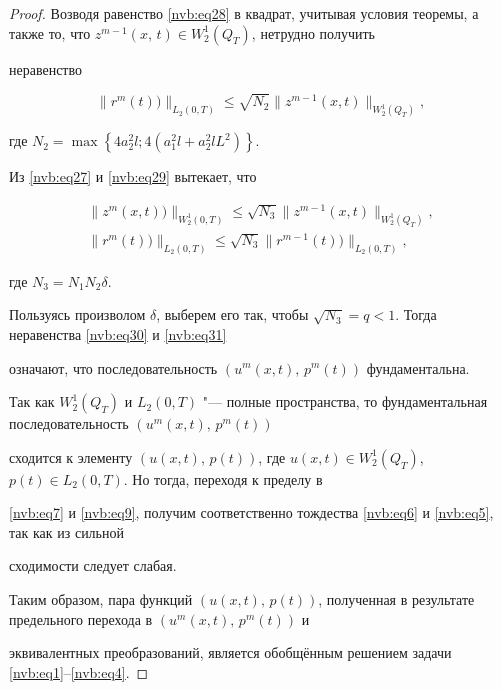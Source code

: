 \begin{proof}
Возводя равенство \eqref{nvb:eq28} в квадрат, учитывая условия теоремы, а также то, что $z^{m-1}(x,\,t)\in W_2^{1}(Q_T)$, нетрудно получить

неравенство

    \begin{equation} \label{nvb:eq29}

     \|r^m(t))\|_{L_2(0,T)} \leq  \sqrt{N_2} \|z^{m-1}(x,t)\|_{W^1_2(Q_T)},

    \end{equation}

где $N_2=\max\left\lbrace 4a_2^2l; 4(a_1^2l+a_2^2lL^2)\right\rbrace.$



Из \eqref{nvb:eq27} и \eqref{nvb:eq29} вытекает, что

    \begin{gather} \label{nvb:eq30}

     \|z^m(x,t))\|_{W^1_2(0,T)} \leq \sqrt{N_3} \|z^{m-1}(x,t)\|_{W^1_2(Q_T)},\\

    \label{nvb:eq31}

     \|r^m(t))\|_{L_2(0,T)} \leq \sqrt{N_3} \|r^{m-1}(t))\|_{L_2(0,T)},

    \end{gather}

где $N_3=N_1N_2\delta$.



Пользуясь произволом $\delta$, выберем его так, чтобы $\sqrt{N_3}=q<1$. Тогда неравенства \eqref{nvb:eq30} и \eqref{nvb:eq31}

означают, что  последовательность $(u^m(x,t),\, p^m(t))$ фундаментальна.



Так как $W_2^{1}(Q_T)$ и $L_2(0,T)$ "--- полные пространства, то фундаментальная последовательность $(u^m(x,t),\,p^m(t))$

сходится к элементу $(u(x,t),\, p(t))$, где $u(x,t) \in W_2^{1}(Q_T)$, $p(t) \in L_2(0,T)$. Но тогда, переходя к пределу в

\eqref{nvb:eq7} и \eqref{nvb:eq9}, получим соответственно тождества \eqref{nvb:eq6} и \eqref{nvb:eq5}, так как из сильной

сходимости следует слабая.



Таким образом, пара функций $(u(x,t),\,p(t))$, полученная в результате предельного перехода в $(u^m(x,t),\,p^m(t))$ и

эквивалентных преобразований, является обобщённым решением задачи \eqref{nvb:eq1}--\eqref{nvb:eq4}.




\end{proof}
